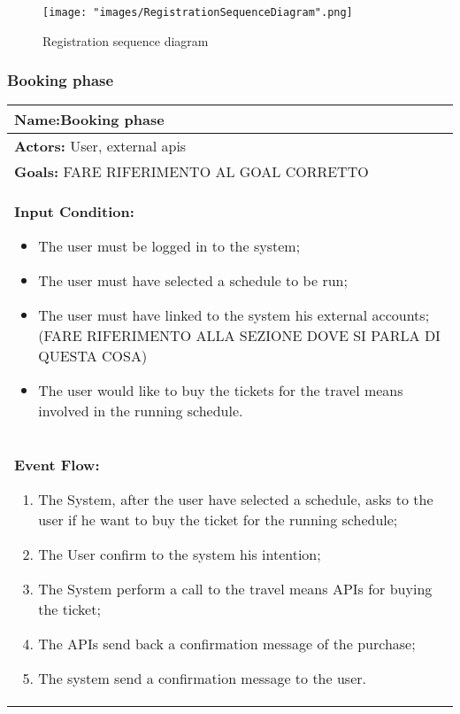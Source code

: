 \begin{figure}[H]
\begin{center}
\texttt{[image: "images/RegistrationSequenceDiagram".png]}
\caption{Registration sequence diagram}
\label{img:seqDiagrAppEditing00}
\end{center}
\end{figure}

\subsubsection{Booking phase} \label{usecase:Booking Phase}

\begin{longtable}{|p{14cm}|} \hline

\textbf{Name:}Booking phase \\ \hline

\textbf{Actors:} User, external apis \\ \hline

\textbf{Goals:} FARE RIFERIMENTO AL GOAL CORRETTO \\ \hline

\textbf{Input Condition:}

\begin{itemize}
\item The user must be logged in to the system;
\item The user must have selected a schedule to be run;
\item The user must have linked to the system his external accounts;(FARE RIFERIMENTO ALLA SEZIONE DOVE SI PARLA DI QUESTA COSA)
\item The user would like to buy the tickets for the travel means involved in the running schedule.
\end{itemize}
 \\ \hline

\textbf{Event Flow:}

\begin{enumerate}
\item The System, after the user have selected a schedule, asks to the user if he want to buy the ticket for the running schedule;
\item The User confirm to the system his intention;
\item The System perform a call to the travel means APIs for buying the ticket;
\item The APIs send back a confirmation message of the purchase;
\item The system send a confirmation message to the user.
\end{enumerate}	\\ \hline


\end{longtable}
